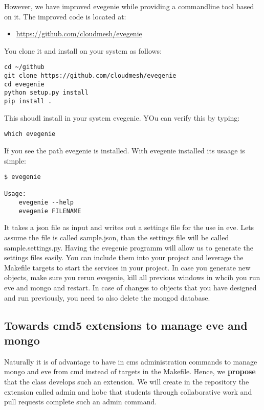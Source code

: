 However, we have improved evegenie while providing a commandline tool
based on it. The improved code is located at:

\begin{itemize}

\item
  \url{https://github.com/cloudmesh/evegenie}
\end{itemize}

You clone it and install on your system as follows:

\begin{verbatim}
cd ~/github
git clone https://github.com/cloudmesh/evegenie
cd evegenie
python setup.py install
pip install .
\end{verbatim}

This shoudl install in your system evegenie. YOu can verify this by
typing:

\begin{verbatim}
which evegenie
\end{verbatim}

If you see the path evegenie is installed. With evegenie installed its
usaage is simple:

\begin{verbatim}
$ evegenie

Usage:
    evegenie --help
    evegenie FILENAME
\end{verbatim}

It takes a json file as input and writes out a settings file for the use
in eve. Lets assume the file is called sample.json, than the settings
file will be called sample.settings.py. Having the evegenie programm
will allow us to generate the settings files easily. You can include
them into your project and leverage the Makefile targets to start the
services in your project. In case you generate new objects, make sure
you rerun evegenie, kill all previous windows in whcih you run eve and
mongo and restart. In case of changes to objects that you have designed
and run previously, you need to also delete the mongod database.

\subsection{Towards cmd5 extensions to manage eve and
mongo}\label{towards-cmd5-extensions-to-manage-eve-and-mongo}

Naturally it is of advantage to have in cms administration commands to
manage mongo and eve from cmd instead of targets in the Makefile. Hence,
we \textbf{propose} that the class develops such an extension. We will
create in the repository the extension called admin and hobe that
students through collaborative work and pull requests complete such an
admin command.

